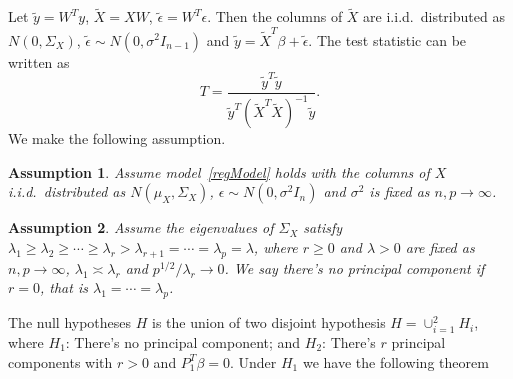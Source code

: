 \documentclass[review]{elsarticle}
\theoremstyle{plain}
\newtheorem{assumption}{\quad\quad Assumption}
\theoremstyle{definition}
\theoremstyle{remark}
\begin{document}
Let $\tilde{y}=W^T y$, $\tilde{X}=XW$, $\tilde{\epsilon}=W^T \epsilon$. Then the columns of $\tilde{X}$ are i.i.d.\  distributed as $N(0,\Sigma_X)$, $\tilde{\epsilon}\sim N(0,\sigma^2 I_{n-1})$ and $\tilde{y}=\tilde{X}^T \beta + \tilde{\epsilon}$.
The test statistic can be written as
\[
    T=\frac{\tilde{y}^T \tilde{y}}{
        \tilde{y}^T{(\tilde{X}^T \tilde{X})}^{-1}\tilde{y}
    }.
    \]
We make the following assumption.
\begin{assumption}\label{assumptiona}
    Assume model~\eqref{regModel} holds with the columns of $X$  i.i.d.\  distributed as $N(\mu_X,\Sigma_X)$, $\epsilon\sim N(0,\sigma^2 I_n)$ and $\sigma^2$ is fixed as $n,p\to \infty$.
\end{assumption}
\begin{assumption}\label{assumptionb}
    Assume the eigenvalues of $\Sigma_X$ satisfy $\lambda_1\geq \lambda_2\geq \cdots \geq\lambda_r> \lambda_{r+1}=\cdots =\lambda_p=\lambda$, where $r\geq 0$ and $\lambda>0$ are fixed as $n,p\to \infty$, $\lambda_1\asymp \lambda_r$ and $p^{1/2}/\lambda_r \to 0$. We say there's no principal component if $r=0$, that is $\lambda_1=\cdots=\lambda_p$.
\end{assumption}

The null hypotheses $H$ is the union of two disjoint hypothesis $H=\cup_{i=1}^2 H_i$, where $H_1$: There's no principal component; and $H_2$:  There's $r$ principal components with $r>0$ and $P_1^T\beta=0$. Under $H_1$ we have the following theorem
\end{document}
